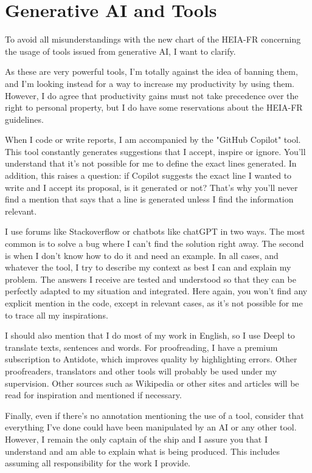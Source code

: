 \chapter{Generative AI and Tools}
\label{ch:tools}

To avoid all misunderstandings with the new chart of the HEIA-FR concerning the
usage of tools issued from generative AI, I want to clarify.

As these are very powerful tools, I'm totally against the idea of banning them,
and I'm looking instead for a way to increase my productivity by using them.
However, I do agree that productivity gains must not take precedence over the
right to personal property, but I do have some reservations about the HEIA-FR
guidelines.

When I code or write reports, I am accompanied by the "GitHub Copilot" tool.
This tool constantly generates suggestions that I accept, inspire or ignore.
You'll understand that it's not possible for me to define the exact lines
generated.
In addition, this raises a question: if Copilot suggests the exact line I wanted
to write and I accept its proposal, is it generated or not?
That's why you'll never find a mention that says that a line is generated unless
I find the information relevant.

I use forums like Stackoverflow or chatbots like chatGPT in two ways.
The most common is to solve a bug where I can't find the solution right away.
The second is when I don't know how to do it and need an example.
In all cases, and whatever the tool, I try to describe my context as best I can
and explain my problem.
The answers I receive are tested and understood so that they can be perfectly
adapted to my situation and integrated.
Here again, you won't find any explicit mention in the code, except in relevant
cases, as it's not possible for me to trace all my inspirations.

I should also mention that I do most of my work in English, so I use Deepl to
translate texts, sentences and words.
For proofreading, I have a premium subscription to Antidote, which improves
quality by highlighting errors.
Other proofreaders, translators and other tools will probably be used under my
supervision.
Other sources such as Wikipedia or other sites and articles will be read for
inspiration and mentioned if necessary.

Finally, even if there's no annotation mentioning the use of a tool, consider
that everything I've done could have been manipulated by an AI or any other tool.
However, I remain the only captain of the ship and I assure you that I
understand and am able to explain what is being produced.
This includes assuming all responsibility for the work I provide.

